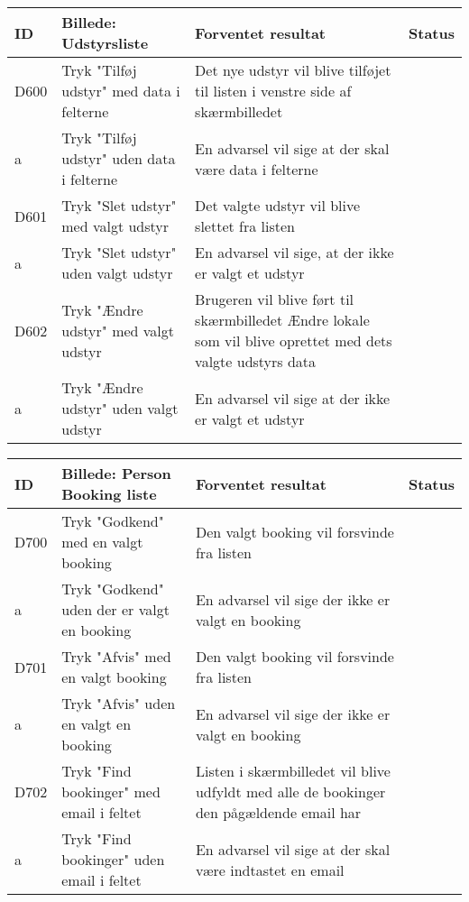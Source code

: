 \begin{tabularx}{\textwidth}{ |X|X|X|X| }
\hline
	ID & Billede: Udstyrsliste  & Forventet resultat & Status\\ 
\hline
	D600 & Tryk "Tilføj udstyr" med data i felterne & Det nye udstyr vil blive tilføjet til listen i venstre side af skærmbilledet & \\
\hline
	a & Tryk "Tilføj udstyr" uden data i felterne & En advarsel vil sige at der skal være data i felterne & \\
\hline
	D601 & Tryk "Slet udstyr" med valgt udstyr & Det valgte udstyr vil blive slettet fra listen & \\
\hline
	a & Tryk "Slet udstyr" uden valgt udstyr & En advarsel vil sige, at der ikke er valgt et udstyr & \\
\hline
	D602 & Tryk "Ændre udstyr" med valgt udstyr & Brugeren vil blive ført til skærmbilledet Ændre lokale som vil blive oprettet med dets valgte udstyrs data & \\
\hline
	a & Tryk "Ændre udstyr" uden valgt udstyr & En advarsel vil sige at der ikke er valgt et udstyr & \\
\hline
\end{tabularx}

\begin{tabularx}{\textwidth}{ |X|X|X|X| }
\hline
	ID & Billede: Person Booking liste   & Forventet resultat & Status\\ 
\hline
	D700 & Tryk "Godkend" med en valgt booking & Den valgt booking vil forsvinde fra listen & \\
\hline
	a & Tryk "Godkend" uden der er valgt en booking & En advarsel vil sige der ikke er valgt en booking & \\
\hline
	D701 & Tryk "Afvis" med en valgt booking & Den valgt booking vil forsvinde fra listen & \\
\hline
	a & Tryk "Afvis" uden en valgt en booking & En advarsel vil sige der ikke er valgt en booking & \\
\hline
	D702 & Tryk "Find bookinger" med email i feltet & Listen i skærmbilledet vil blive udfyldt med alle de bookinger den pågældende email har & \\
\hline 
	a & Tryk "Find bookinger" uden email i feltet & En advarsel vil sige at der skal være indtastet en email & \\
\hline
\end{tabularx}

